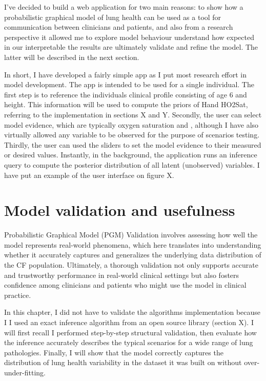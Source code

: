 I've decided to build a web application for two main reasons: to show how a probabilistic graphical model of lung health can be used as a tool for communication between clinicians and patients, and also from a research perspective it allowed me to explore model behaviour understand how expected in our interpretable the results are ultimately validate and refine the model. The latter will be described in the next section.

In short, I have developed a fairly simple app as I put most research effort in model development. The app is intended to be used for a single individual. The first step is to reference the individuals clinical profile consisting of age 6 and height. This information will be used to compute the priors of H\F and HO2Sat, referring to the implementation in sections X and Y. Secondly, the user can select model evidence, which are typically oxygen saturation and \F, although I have also virtually allowed any variable to be observed for the purpose of scenarios testing. Thirdly, the user can used the sliders to set the model evidence to their measured or desired values. Instantly, in the background, the application runs an inference query to compute the posterior distribution of all latent (unobserved) variables. I have put an example of the user interface on figure X.



\section{Model validation and usefulness}

Probabilistic Graphical Model (PGM) Validation involves assessing how well the model represents real-world phenomena, which here translates into understanding whether it accurately captures and generalizes the underlying data distribution of the CF population. Ultimately, a thorough validation not only supports accurate and trustworthy performance in real-world clinical settings but also fosters confidence among clinicians and patients who might use the model in clinical practice. 

In this chapter, I did not have to validate the algorithms implementation because I I used an exact inference algorithm from an open source library (section X). I will first recall I performed step-by-step structural validation, then evaluate how the inference accurately describes the typical scenarios for a wide range of lung pathologies. Finally, I will show that the model correctly captures the distribution of lung health variability in the dataset it was built on without over- under-fitting.

